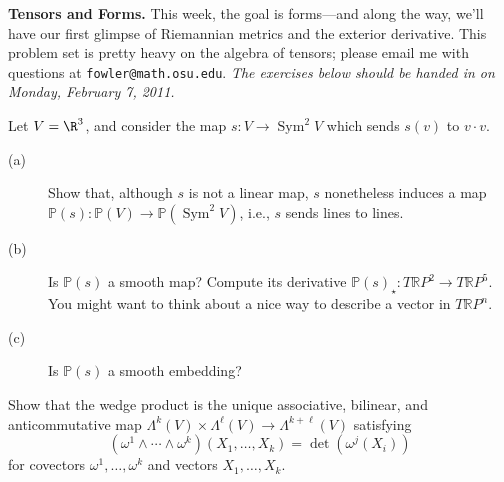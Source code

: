 \documentclass[12pt]{pset}
\author{Jim Fowler}
\date{Winter 2011}
\newcommand{\RP}{\mathbb{R}P}
\DeclareMathOperator{\Sym}{Sym}
\newcommand{\Proj}{\mathbb{P}}
\begin{document}
\maketitle

\noindent\textbf{Tensors and Forms.}  This week, the goal is
forms---and along the way, we'll have our first glimpse of Riemannian
metrics and the exterior derivative.  This problem set is pretty heavy
on the algebra of tensors; please email me with questions at
\texttt{fowler@math.osu.edu}.  \textit{The exercises below should be
  handed in on Monday, February 7, 2011.}

\begin{problem}

  Let $V = \R^3$, and consider the map $s : V \to \Sym^2 V$ which
  sends $s(v)$ to $v \cdot v$.
  \begin{description}
  \item[(a)] Show that, although $s$ is not a linear map, $s$
    nonetheless induces a map $\Proj(s) : \Proj(V) \to \Proj(\Sym^2
    V)$, i.e., $s$ sends lines to lines.
  \item[(b)] Is $\Proj(s)$ a smooth map?  Compute its derivative
    $\Proj(s)_\star : T\RP^2 \to T\RP^5$.  You might want to think
    about a nice way to describe a vector in $T\RP^n$.
  \item[(c)] Is $\Proj(s)$ a smooth embedding?
  \end{description}


\end{problem}

\begin{problem}

Show that the wedge product is the unique associative, bilinear, and
anticommutative map $\Lambda^k(V) \times \Lambda^\ell (V) \to
\Lambda^{k + \ell}(V)$ satisfying
$$
(\omega^1 \wedge \cdots \wedge \omega^k)(X_1,\ldots,X_k) = \det\left(
\omega^j(X_i) \right)
$$  
for covectors $\omega^1, \ldots, \omega^k$ and vectors $X_1, \ldots, X_k$.

\end{problem}
\end{document}
